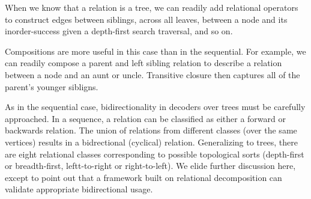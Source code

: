 
When we know that a relation is a tree, we can readily add relational operators 
to construct edges between siblings, across all leaves, between a node and its 
inorder-success given a depth-first search traversal, and so on.

Compositions are more useful in this case than in the sequential. For example, 
we can readily compose a parent and left sibling relation to describe a relation 
between a node and an aunt or uncle. Transitive closure then captures all of the 
parent's younger sibligns.

As in the sequential case, bidirectionality in decoders over trees must be 
carefully approached.  In a sequence, a relation can be classified as either a 
forward or backwards relation. The union of relations from different classes 
(over the same vertices) results in a
bidrectional (cyclical) relation.  Generalizing to trees, there are eight 
relational classes
corresponding to possible topological sorts (depth-first or breadth-first, 
leftt-to-right or right-to-left).  We elide further discussion here, except to 
point out that a framework built on relational decomposition can validate 
appropriate bidirectional usage.







